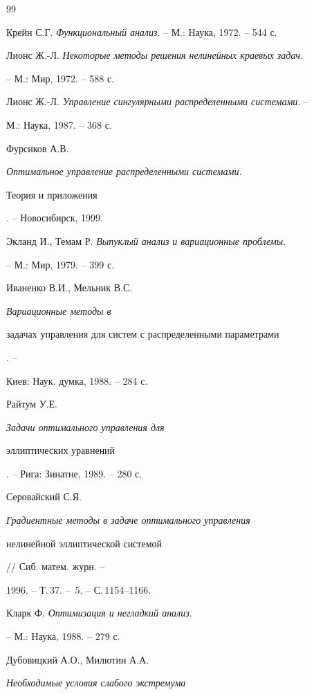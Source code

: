 \begin{thebibliography}{99} 


 




Крейн С.Г. {\em Функциональный анализ}. -- М.: Наука, 1972. -- 544 с. 




Лионс Ж.-Л. {\em Некоторые методы решения нелинейных краевых задач}. 


-- М.: Мир, 1972. -- 588 с. 




Лионс Ж.-Л. {\em Управление сингулярными распределенными системами}. -- 


М.: Наука, 1987. -- 368 с. 




Фурсиков А.В. {\em Оптимальное управление распределенными системами. 


Теория и приложения}. -- Новосибирск, 1999. 




Экланд И., Темам Р. {\em Выпуклый анализ и вариационные проблемы}. 


-- М.: Мир, 1979. -- 399 с. 




Иваненко В.И., Мельник В.С. {\em Вариационные методы в 


задачах управления для систем с распределенными параметрами}. -- 


Киев: Наук. думка, 1988. -- 284 с. 




Райтум У.Е. {\em Задачи оптимального управления для 


эллиптических уравнений}. -- Рига: Зинатне, 1989. -- 280 с. 




Серовайский С.Я. {\em Градиентные методы в задаче оптимального управления 


нелинейной эллиптической системой} // Сиб. матем. журн. -- 


1996. -- Т.\,37. -- \No\,5. -- С.\,1154--1166. 




Кларк Ф. {\em Оптимизация и негладкий анализ}. 


-- М.: Наука, 1988. -- 279 с. 




Дубовицкий А.О., Милютин А.А. {\em Необходимые условия слабого экстремума 


}
\end{thebibliography}
